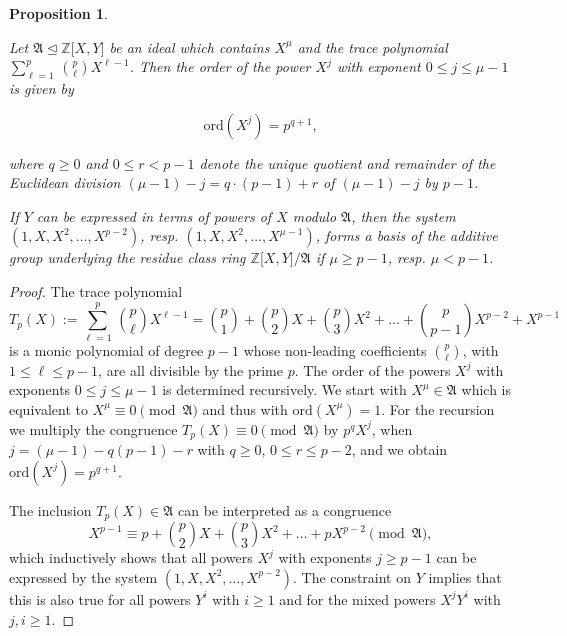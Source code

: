 \documentclass{amsart}
\newtheorem{proposition}{Proposition}[section]
\theoremstyle{definition}
\numberwithin{equation}{section}
\begin{document}
\begin{proposition}
\label{prp:OrdPowXMaxP}

Let \(\mathfrak{A}\unlhd\mathbb{Z}\lbrack X,Y\rbrack\) be an ideal
which contains \(X^\mu\) and the trace polynomial \(\sum_{\ell=1}^p\,\binom{p}{\ell}X^{\ell-1}\).
Then the order of the power \(X^{j}\) with exponent \(0\le j\le\mu-1\) is given by

\begin{equation}
\label{eqn:OrdPowXMaxP}
\mathrm{ord}(X^{j})=p^{q+1},
\end{equation}

\noindent
where \(q\ge 0\) and \(0\le r<p-1\) denote the unique quotient and remainder
of the Euclidean division \((\mu-1)-j=q\cdot (p-1)+r\) of \((\mu-1)-j\) by \(p-1\).

If \(Y\) can be expressed in terms of powers of \(X\) modulo \(\mathfrak{A}\),
then the system \(\left(1,X,X^2,\ldots,X^{p-2}\right)\), resp. \(\left(1,X,X^2,\ldots,X^{\mu-1}\right)\),
forms a basis of the additive group underlying the residue class ring \(\mathbb{Z}\lbrack X,Y\rbrack/\mathfrak{A}\)
if \(\mu\ge p-1\), resp. \(\mu<p-1\).

\end{proposition}

\begin{proof}
The trace polynomial
\[T_p(X):=\sum_{\ell=1}^p\,\binom{p}{\ell}X^{\ell-1}=\binom{p}{1}+\binom{p}{2}X+\binom{p}{3}X^{2}+\ldots+\binom{p}{p-1}X^{p-2}+X^{p-1}\]
is a monic polynomial of degree \(p-1\)
whose non-leading coefficients \(\binom{p}{\ell}\), with \(1\le\ell\le p-1\), are all divisible by the prime \(p\). 
The order of the powers \(X^{j}\) with exponents \(0\le j\le\mu-1\) is determined recursively.
We start with \(X^\mu\in\mathfrak{A}\) which is equivalent to \(X^\mu\equiv 0\pmod{\mathfrak{A}}\)
and thus with \(\mathrm{ord}(X^\mu)=1\).
For the recursion we multiply the congruence \(T_p(X)\equiv 0\pmod{\mathfrak{A}}\)
by \(p^{q}X^{j}\), when \(j=(\mu-1)-q(p-1)-r\) with \(q\ge 0\), \(0\le r\le p-2\),
and we obtain \(\mathrm{ord}(X^j)=p^{q+1}\).

The inclusion \(T_p(X)\in\mathfrak{A}\) can be interpreted as a congruence
\[X^{p-1}\equiv p+\binom{p}{2}X+\binom{p}{3}X^{2}+\ldots+pX^{p-2}\pmod{\mathfrak{A}},\]
which inductively shows that all powers \(X^j\) with exponents \(j\ge p-1\)
can be expressed by the system \(\left(1,X,X^2,\ldots,X^{p-2}\right)\).
The constraint on \(Y\) implies that this is also true for all powers \(Y^i\) with \(i\ge 1\)
and for the mixed powers \(X^jY^i\) with \(j,i\ge 1\).
\end{proof}
\end{document}
